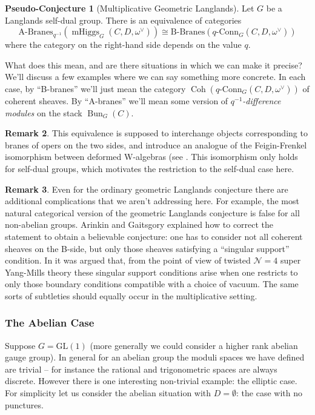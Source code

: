 \documentclass[11pt, oneside, reqno]{amsart}
\theoremstyle{definition} \newtheorem{definition}{Definition}[section]
\theoremstyle{definition} \newtheorem{remark}[definition]{Remark}
\theoremstyle{definition} \newtheorem{remarks}[definition]{Remarks}
\theoremstyle{definition} \newtheorem{question}[definition]{Question}
\theoremstyle{definition} \newtheorem*{note}{Note}
\theoremstyle{definition} \newtheorem{example}[definition]{Example}
\theoremstyle{definition} \newtheorem{examples}[definition]{Examples}
\newtheorem{pseudoconj}[definition]{Pseudo-Conjecture}
\newcommand{\mc}[1]{\mathcal{#1}}
\newcommand{\GL}{\mathrm{GL}}
\newcommand{\iso}{\cong}
\DeclareMathOperator{\coh}{Coh}
\DeclareMathOperator{\bun}{Bun}
\DeclareMathOperator{\mhiggs}{mHiggs}
\newcommand{\qconn}{q\text{-Conn}}
\begin{document}
\begin{pseudoconj}[Multiplicative Geometric Langlands] \label{multLanglands}
Let $G$ be a Langlands self-dual group.  There is an equivalence of categories
\[\text{A-Branes}_{q^{-1}}(\mhiggs_G(C,D,\omega^\vee)) \iso \text{B-Branes}(\qconn_G(C, D, \omega^\vee))\]
where the category on the right-hand side depends on the value $q$.
\end{pseudoconj}

What does this mean, and are there situations in which we can make it precise?  We'll discuss a few examples where we can say something more concrete.  In each case, by ``B-branes'' we'll just mean the category $\coh(\qconn_G(C, D, \omega^\vee))$ of coherent sheaves.  By ``A-branes'' we'll mean some version of \emph{$q^{-1}$-difference modules} on the stack $\bun_G(C)$. 

\begin{remark}
This equivalence is supposed to interchange objects corresponding to branes of opers on the two sides, and introduce an analogue of the Feigin-Frenkel isomorphism between deformed W-algebras (see \cite{FrenkelReshetikhinSTS, STSSevostyanov}.  This isomorphism only holds for self-dual groups, which motivates the restriction to the self-dual case here.
\end{remark}

\begin{remark}
Even for the ordinary geometric Langlands conjecture there are additional complications that we aren't addressing here.  For example, the most natural categorical version of the geometric Langlands conjecture is false for all non-abelian groups.  Arinkin and Gaitsgory \cite{ArinkinGaitsgory} explained how to correct the statement to obtain a believable conjecture: one has to consider not all coherent sheaves on the B-side, but only those sheaves satisfying a ``singular support'' condition.  In \cite{ElliottYoo2} it was argued that, from the point of view of twisted $\mc N=4$ super Yang-Mills theory these singular support conditions arise when one restricts to only those boundary conditions compatible with a choice of vacuum.  The same sorts of subtleties should equally occur in the multiplicative setting.
\end{remark}

\subsubsection{The Abelian Case}
Suppose $G = \GL(1)$ (more generally we could consider a higher rank abelian gauge group).  In general for an abelian group the moduli spaces we have defined are trivial -- for instance the rational and trigonometric spaces are always discrete.  However there is one interesting non-trivial example: the elliptic case.  For simplicity let us consider the abelian situation with $D = \emptyset$: the case with no punctures.
\end{document}
